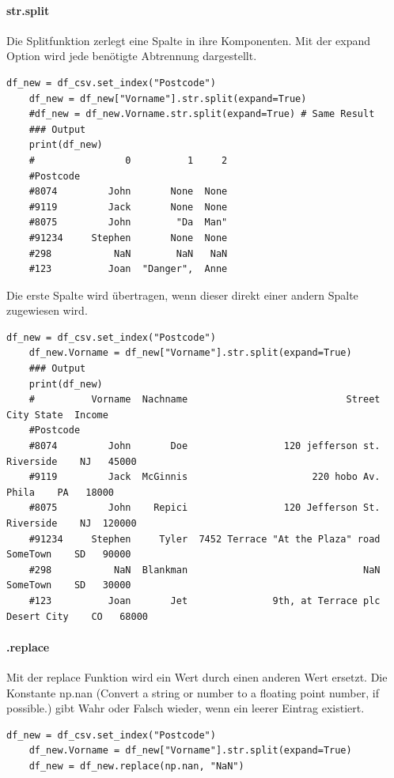 \paragraph*{str.split}
Die Splitfunktion zerlegt eine Spalte in ihre Komponenten.
Mit der expand Option wird jede benötigte Abtrennung dargestellt.
\begin{lstlisting}[style=python]
	df_new = df_csv.set_index("Postcode")
	df_new = df_new["Vorname"].str.split(expand=True)
	#df_new = df_new.Vorname.str.split(expand=True) # Same Result
	### Output
	print(df_new)
	#                0          1     2
	#Postcode
	#8074         John       None  None
	#9119         Jack       None  None
	#8075         John        "Da  Man"
	#91234     Stephen       None  None
	#298           NaN        NaN   NaN
	#123          Joan  "Danger",  Anne
\end{lstlisting}
Die erste Spalte wird übertragen, wenn dieser direkt einer andern Spalte zugewiesen wird.
\begin{lstlisting}[style=python]
	df_new = df_csv.set_index("Postcode")
	df_new.Vorname = df_new["Vorname"].str.split(expand=True)
	### Output
	print(df_new)
	#          Vorname  Nachname                            Street         City State  Income
	#Postcode
	#8074         John       Doe                 120 jefferson st.    Riverside    NJ   45000
	#9119         Jack  McGinnis                      220 hobo Av.        Phila    PA   18000
	#8075         John    Repici                 120 Jefferson St.    Riverside    NJ  120000
	#91234     Stephen     Tyler  7452 Terrace "At the Plaza" road     SomeTown    SD   90000
	#298           NaN  Blankman                               NaN     SomeTown    SD   30000
	#123          Joan       Jet               9th, at Terrace plc  Desert City    CO   68000
\end{lstlisting}

\paragraph*{.replace}
Mit der replace Funktion wird ein Wert durch einen anderen Wert ersetzt. Die Konstante np.nan (Convert a string or number to a floating point number, if possible.) gibt Wahr oder Falsch wieder, wenn ein leerer Eintrag existiert.

\begin{lstlisting}[style=python]
	df_new = df_csv.set_index("Postcode")
	df_new.Vorname = df_new["Vorname"].str.split(expand=True)
	df_new = df_new.replace(np.nan, "NaN")
\end{lstlisting}

